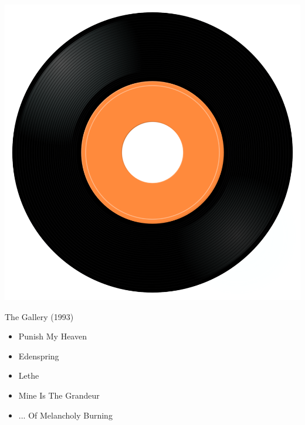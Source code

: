\begin{minipage}[t]{0.25\textwidth}\vspace{0pt}
\captionsetup{type=figure}
\includegraphics[width=\textwidth]{Images/cover.png}
\caption*{The Gallery (1993)}
\end{minipage}
\begin{minipage}[t]{0.25\textwidth}\vspace{0pt}
\begin{itemize}[nosep,leftmargin=1em,labelwidth=*,align=left]
	\setlength{\itemsep}{0pt}
	\item Punish My Heaven
	\item Edenspring
	\item Lethe
	\item Mine Is The Grandeur
	\item ... Of Melancholy Burning
\end{itemize}
\end{minipage}
